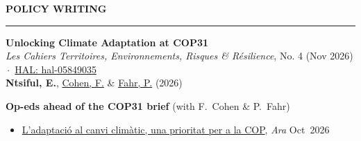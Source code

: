 \documentclass{resume} %
\def\sectionskip{\vspace{4pt}}
\def\sectionlineskip{\smallskip}
\renewenvironment{rSection}[1]{%
  \sectionskip
  \MakeUppercase{{\bf #1}}%
  \sectionlineskip
  \hrule
  \begin{list}{}{\setlength{\leftmargin}{0em}\setlength{\topsep}{5pt}\setlength{\itemsep}{0pt}\setlength{\parsep}{0pt}}%
  \item[]
}{%
  \end{list}
}
\newcommand{\when}[1]{\hfill\mbox{#1}}
\begin{document}
\begin{rSection}{Policy Writing}
\textbf{Unlocking Climate Adaptation at COP31}\\
\textit{Les Cahiers Territoires, Environnements, Risques \& R\'esilience}, No. 4 (Nov 2026) \,$\cdot$\, \href{https://hal.science/hal-05849035}{HAL: hal-05849035}\\
\textbf{Ntsiful, E.}, \href{https://sites.google.com/site/francoiscoheneconomist/home}{Cohen, F.} \& \href{https://www.phc.ox.ac.uk/team/patrick-fahr}{Fahr, P.} (2026)

\smallskip
\textbf{Op-eds ahead of the COP31 brief} (with F.~Cohen \& P.~Fahr)
\begin{itemize}
\item \href{https://empreses.ara.cat/opinio/l-adaptacio-canvi-climatic-prioritat-cop_129_5879985.html}{L'adaptaci\'o al canvi clim\`atic, una prioritat per a la COP}, \textit{Ara} \when{Oct 2026}
\end{itemize}
\end{rSection}
\end{document}
